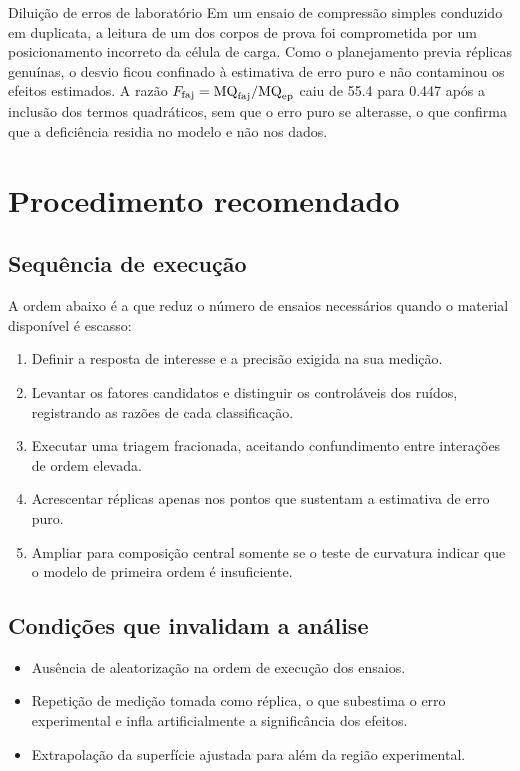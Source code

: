 \begin{aplicacao}{Diluição de erros de laboratório}
  Em um ensaio de compressão simples conduzido em duplicata, a leitura de um
  dos corpos de prova foi comprometida por um posicionamento incorreto da
  célula de carga. Como o planejamento previa réplicas genuínas, o desvio
  ficou confinado à estimativa de erro puro e não contaminou os efeitos
  estimados. A razão $F_{\mathrm{faj}} = \mathrm{MQ}_{\mathrm{faj}} / \mathrm{MQ}_{\mathrm{ep}}$ caiu de
  \num{55.4} para \num{0.447} após a inclusão dos termos quadráticos, sem que
  o erro puro se alterasse, o que confirma que a deficiência residia no
  modelo e não nos dados.
\end{aplicacao}

\section{Procedimento recomendado}

\subsection{Sequência de execução}

A ordem abaixo é a que reduz o número de ensaios necessários quando o material
disponível é escasso:

\begin{enumerate}[label=\arabic*., itemsep=2pt, topsep=4pt, leftmargin=*]
  \item Definir a resposta de interesse e a precisão exigida na sua medição.
  \item Levantar os fatores candidatos e distinguir os controláveis dos
    ruídos, registrando as razões de cada classificação.
  \item Executar uma triagem fracionada, aceitando confundimento entre
    interações de ordem elevada.
  \item Acrescentar réplicas apenas nos pontos que sustentam a estimativa de
    erro puro.
  \item Ampliar para composição central somente se o teste de curvatura
    indicar que o modelo de primeira ordem é insuficiente.
\end{enumerate}

\subsection{Condições que invalidam a análise}

\begin{itemize}[label=\textbullet, itemsep=2pt, topsep=4pt, leftmargin=*]
  \item Ausência de aleatorização na ordem de execução dos ensaios.
  \item Repetição de medição tomada como réplica, o que subestima o erro
    experimental e infla artificialmente a significância dos efeitos.
  \item Extrapolação da superfície ajustada para além da região experimental.
\end{itemize}

